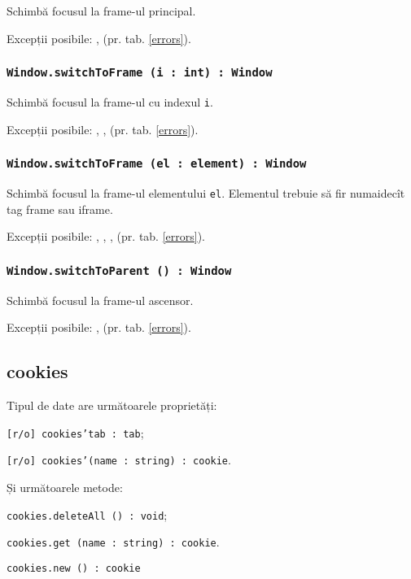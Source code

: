 Schimbă focusul la frame-ul principal.

Excepții posibile: ,  (pr. tab. \ref{errors}).

\subsubsection{\texttt{Window.switchToFrame (i : int) : Window}}

Schimbă focusul la frame-ul cu indexul \texttt{i}.

Excepții posibile: , ,  (pr. tab. \ref{errors}).

\subsubsection{\texttt{Window.switchToFrame (el : element) : Window}}

Schimbă focusul la frame-ul elementului \texttt{el}. Elementul trebuie să fir numaidecît tag frame sau iframe.

Excepții posibile: , , ,  (pr. tab. \ref{errors}).

\subsubsection{\texttt{Window.switchToParent () : Window}}

Schimbă focusul la frame-ul ascensor.

Excepții posibile: ,  (pr. tab. \ref{errors}).

\subsection{{\color{orange} cookies}}

Tipul de date \cookies{} are următoarele proprietăți:
\begin{icItems}
	\item \texttt{[r/o] cookies'tab : tab};
	\item \texttt{[r/o] cookies'(name : string) : cookie}.
\end{icItems}

Și următoarele metode: 
\begin{icItems}
	\item \texttt{cookies.deleteAll () : void};
	\item \texttt{cookies.get (name : string) : cookie}.
	\item \texttt{cookies.new () : cookie}
\end{icItems}

